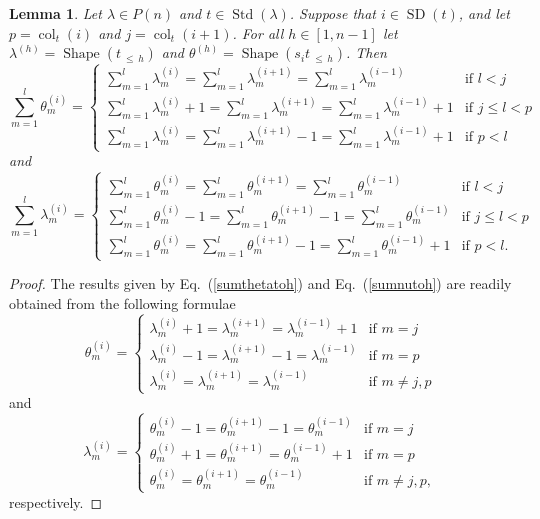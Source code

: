 \documentclass[10pt]{amsart}
\newtheorem{lemm}[theo]{Lemma}
\theoremstyle{definition}
\DeclareMathOperator{\col}{col}
\newcommand{\Lessthan}[2]{#1\,{_{\leqslant\,#2}}}
\DeclareMathOperator{\STD}{Std}
\DeclareMathOperator{\shape}{Shape}
\DeclareMathOperator{\SD}{SD}
\begin{document}
\begin{lemm}\label{shapetheta}
Let $\lambda\in P(n)$ and $t\in\STD(\lambda)$. Suppose that $i\in\SD(t)$,
and let $p=\col_t(i)$ and $j=\col_t(i+1)$. For all
$h\in[1,n-1]$ let $\lambda^{(h)}=\shape(\Lessthan th)$ and $\theta^{(h)}=\shape(\Lessthan{s_it}h)$.
Then
\begin{equation}\label{sumthetatoh}
\sum_{m=1}^l \theta^{(i)}_m =
\begin{cases}
\sum_{m=1}^l \lambda^{(i)}_m = \sum_{m=1}^l \lambda^{(i+1)}_m = \sum_{m=1}^l \lambda^{(i-1)}_m & \text{if $l<j$}\\
\sum_{m=1}^l \lambda^{(i)}_m + 1 = \sum_{m=1}^l \lambda^{(i+1)}_m = \sum_{m=1}^l \lambda^{(i-1)}_m + 1 & \text{if $j\leqslant l<p$}\\
\sum_{m=1}^l \lambda^{(i)}_m = \sum_{m=1}^l \lambda^{(i+1)}_m - 1= \sum_{m=1}^l \lambda^{(i-1)}_m + 1& \text{if $p<l$}
\end{cases}
\end{equation}
and
\begin{equation}\label{sumnutoh}
\sum_{m=1}^l \lambda^{(i)}_m =
\begin{cases}
\sum_{m=1}^l \theta^{(i)}_m = \sum_{m=1}^l \theta^{(i+1)}_m = \sum_{m=1}^l \theta^{(i-1)}_m & \text{if $l<j$}\\
\sum_{m=1}^l \theta^{(i)}_m - 1 = \sum_{m=1}^l \theta^{(i+1)}_m - 1= \sum_{m=1}^l \theta^{(i-1)}_m & \text{if $j\leqslant l<p$}\\
\sum_{m=1}^l \theta^{(i)}_m = \sum_{m=1}^l \theta^{(i+1)}_m - 1= \sum_{m=1}^l \theta^{(i-1)}_m + 1& \text{if $p<l$}.
\end{cases}
\end{equation}
\end{lemm}
\begin{proof}
The results given by Eq.~(\ref{sumthetatoh}) and Eq.~(\ref{sumnutoh}) are readily obtained from the following formulae
\begin{equation}\label{thetam}
\theta^{(i)}_m =
\begin{cases}
\lambda^{(i)}_m + 1 = \lambda^{(i+1)}_{m} = \lambda^{(i-1)}_m + 1 & \text{if $m=j$}\\
\lambda^{(i)}_m - 1 = \lambda^{(i+1)}_{m} - 1 = \lambda^{(i-1)}_m & \text{if $m=p$}\\
\lambda^{(i)}_m = \lambda^{(i+1)}_{m} = \lambda^{(i-1)}_m & \text{if $m\neq j,p$}
\end{cases}
\end{equation}
and
\begin{equation}\label{num}
\lambda^{(i)}_m =
\begin{cases}
\theta^{(i)}_m - 1 = \theta^{(i+1)}_{m} - 1 = \theta^{(i-1)}_m & \text{if $m=j$}\\
\theta^{(i)}_m + 1 = \theta^{(i+1)}_{m} = \theta^{(i-1)}_m + 1 & \text{if $m=p$}\\
\theta^{(i)}_m = \theta^{(i+1)}_{m} = \theta^{(i-1)}_m & \text{if $m\neq j,p$},
\end{cases}
\end{equation}
respectively.
\end{proof}
\end{document}
